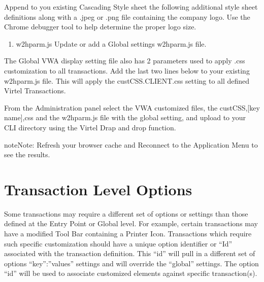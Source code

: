 \documentclass[letterpaper,10pt,english]{sphinxmanual}
\begin{document}
\sphinxAtStartPar
Append to you existing Cascading Style sheet the following additional style sheet definitions along with a .jpeg or .png file containing the company logo. Use the Chrome debugger tool to help determine the proper logo size.

\sphinxAtStartPar
{}
\begin{enumerate}
%
\setcounter{enumi}{1}
\item {} 
\sphinxAtStartPar
w2hparm.js                  Update or add a Global settings w2hparm.js file.

\end{enumerate}

\sphinxAtStartPar
The Global VWA display setting file also has 2 parameters used to apply .css customization to all transactions. Add the last two lines below to your existing w2hparm.js file.  This will apply the custCSS.CLIENT.css setting to all defined Virtel Transactions.

\sphinxAtStartPar
{}

\sphinxAtStartPar
From the Administration panel select the VWA customized files, the custCSS,{[}key name{]},css and the w2hparm.js file with the global setting, and upload to your CLI directory using the Virtel Drap and drop function.

\sphinxAtStartPar
{}

\begin{sphinxadmonition}{note}{Note:}
\sphinxAtStartPar
Refresh your browser cache and Reconnect to the Application Menu to see the results.
\end{sphinxadmonition}

\ignorespaces 

\section{Transaction Level Options}
\label{\detokenize{Customization:transaction-level-options}}\label{\detokenize{Customization:index-5}}
\sphinxAtStartPar
Some transactions may require a different set of options or settings than those defined at the Entry Point or Global level. For example, certain transactions may have a modified Tool Bar containing a Printer Icon. Transactions which require such specific customization should have a unique option identifier or “Id” associated with the transaction definition. This “id” will pull in a different set of options “key”:”values” settings and will override the “global” settings. The option “id” will be used to associate customized elements against specific transaction(s).
\end{document}
